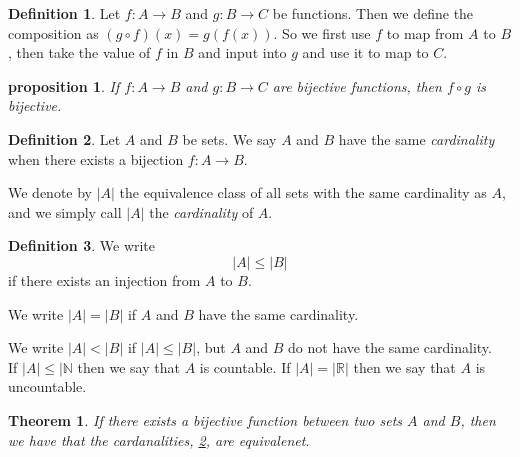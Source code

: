 \documentclass{article}
\newtheorem{theorem}{Theorem}[section]
\newtheorem{proposition}{Proposition}[section]
\newtheorem{proposition}{proposition}[section]
\theoremstyle{definition}
\newtheorem{definition}{Definition}[section]
\theoremstyle{remark}
\begin{document}
\begin{definition}
Let $f: A \to B$ and $g:B \to C$ be functions. Then we define the composition as $(g \circ f)(x) = g(f(x))$. So we first use $f$ to map from $A$ to $B$, then take the value of $f$ in $B$ and input into $g$ and use it to map to $C$.
\end{definition}



\begin{proposition}
If $f: A \to B$ and $g: B\to C$ are bijective functions, then $f \circ g$ is bijective.
\end{proposition}






\begin{definition} \label{def:cardinality}
Let \( A \) and \( B \) be sets. We say \( A \) and \( B \) have the same \textit{cardinality} when there exists a bijection \( f: A \to B \). 

We denote by \( |A| \) the equivalence class of all sets with the same cardinality as \( A \), and we simply call \( |A| \) the \textit{cardinality} of \( A \).
\end{definition}




















\begin{definition} \label{def:cardinality_comparison}
We write
\[
|A| \leq |B|
\]
if there exists an injection from \( A \) to \( B \). 

We write \( |A| = |B| \) if \( A \) and \( B \) have the same cardinality. 

We write \( |A| < |B| \) if \( |A| \leq |B| \), but \( A \) and \( B \) do not have the same cardinality.\\
If $ |A| \leq |\mathbb{N}$ then we say that $A$ is countable. If $|A| = |\mathbb{R}|$ then we say that $A$ is uncountable.
\end{definition}





\begin{theorem}
If there exists a bijective function between two sets $A$ and $B$, then we have that the cardanalities, \ref{def:cardinality}, are equivalenet. 
\end{theorem}
\end{document}
